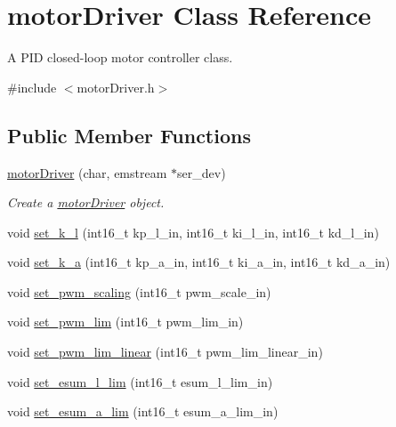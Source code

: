\hypertarget{classmotorDriver}{}\section{motor\+Driver Class Reference}
\label{classmotorDriver}


A P\+ID closed-\/loop motor controller class.  




{\ttfamily \#include $<$motor\+Driver.\+h$>$}

\subsection*{Public Member Functions}
\begin{DoxyCompactItemize}
\item 
\mbox{\hyperlink{classmotorDriver_accdc35f52d3eba2302b2abb40566e271}{motor\+Driver}} (char, emstream $\ast$ser\+\_\+dev)
\begin{DoxyCompactList}\small\item\em Create a \mbox{\hyperlink{classmotorDriver}{motor\+Driver}} object. \end{DoxyCompactList}\item 
void \mbox{\hyperlink{classmotorDriver_ab246686cb5fa83bcbe5d823b1fe10916}{set\+\_\+k\+\_\+l}} (int16\+\_\+t kp\+\_\+l\+\_\+in, int16\+\_\+t ki\+\_\+l\+\_\+in, int16\+\_\+t kd\+\_\+l\+\_\+in)
\item 
void \mbox{\hyperlink{classmotorDriver_a6c33038958e390dcf98d2f72b6341491}{set\+\_\+k\+\_\+a}} (int16\+\_\+t kp\+\_\+a\+\_\+in, int16\+\_\+t ki\+\_\+a\+\_\+in, int16\+\_\+t kd\+\_\+a\+\_\+in)
\item 
void \mbox{\hyperlink{classmotorDriver_ad226c2718cab94496bf293434902d8ac}{set\+\_\+pwm\+\_\+scaling}} (int16\+\_\+t pwm\+\_\+scale\+\_\+in)
\item 
void \mbox{\hyperlink{classmotorDriver_aa7436e1db41a973893e57d03842f3886}{set\+\_\+pwm\+\_\+lim}} (int16\+\_\+t pwm\+\_\+lim\+\_\+in)
\item 
void \mbox{\hyperlink{classmotorDriver_a88cb40b067f63fe0c44b444352909246}{set\+\_\+pwm\+\_\+lim\+\_\+linear}} (int16\+\_\+t pwm\+\_\+lim\+\_\+linear\+\_\+in)
\item 
void \mbox{\hyperlink{classmotorDriver_acc7dca0d73b3603ba74b74852bf14d18}{set\+\_\+esum\+\_\+l\+\_\+lim}} (int16\+\_\+t esum\+\_\+l\+\_\+lim\+\_\+in)
\item 
void \mbox{\hyperlink{classmotorDriver_af6a5a35004ac1a9b7b3c928e75b04c99}{set\+\_\+esum\+\_\+a\+\_\+lim}} (int16\+\_\+t esum\+\_\+a\+\_\+lim\+\_\+in)

\end{DoxyCompactItemize}

